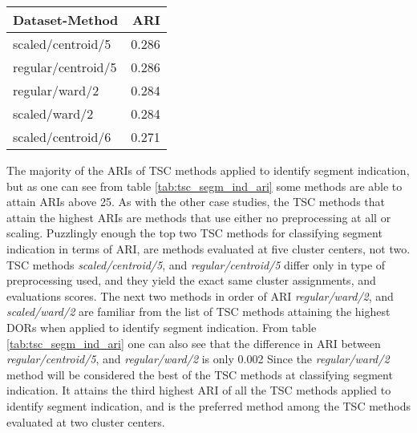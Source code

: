 \begin{table*}
    \centering
    \begin{tabular}{lr}
        \toprule
        Dataset-Method     &  ARI \\
        \midrule
        scaled/centroid/5  & 0.286 \\
        regular/centroid/5 & 0.286 \\
        regular/ward/2     & 0.284 \\
        scaled/ward/2      & 0.284 \\
        scaled/centroid/6  & 0.271 \\
        \bottomrule
    \end{tabular}
    \caption{The five highest ARI scores attained when applying TSC for detecting segmend indication.
             The \textbf{Dataset-Method} column indicates \textit{Type of preprocessing used}$/$\textit{Linkage criteria of method}$/$\textit{Number of cluster centers}.}
    \label{tab:tsc_segm_ind_ari}
\end{table*}

The majority of the ARIs of TSC methods applied to identify segment indication, but as one can see from table \ref{tab:tsc_segm_ind_ari} some methods are able to attain ARIs above 25.
As with the other case studies, the TSC methods that attain the highest ARIs are methods that use either no preprocessing at all or scaling. 
Puzzlingly enough the top two TSC methods for classifying segment indication in terms of ARI, are methods evaluated at five cluster centers, not two. 
TSC methods \textit{scaled/centroid/5}, and \textit{regular/centroid/5} differ only in type of preprocessing used, and they yield the exact same cluster assignments, and evaluations scores.
The next two methods in order of ARI \textit{regular/ward/2}, and \textit{scaled/ward/2} are familiar from the list of TSC methods attaining the highest DORs when applied to identify segment indication.
From table \ref{tab:tsc_segm_ind_ari} one can also see that the difference in ARI between \textit{regular/centroid/5}, and \textit{regular/ward/2} is only 0.002
Since the \textit{regular/ward/2} method will be considered the best of the TSC methods at classifying segment indication.
It attains the third highest ARI of all the TSC methods applied to identify segment indication, and is the preferred method among the TSC methods evaluated at two cluster centers.

